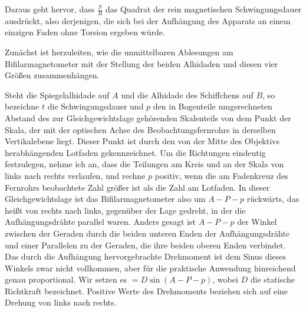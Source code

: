 Daraus geht hervor, dass $\frac{S}{R}$ das Quadrat der rein magnetischen Schwingungsdauer ausdrückt, also derjenigen, die sich bei der Aufhängung des Apparats an einem einzigen Faden ohne Torsion ergeben würde.

Zunächst ist herzuleiten, wie die unmittelbaren Ablesungen am Bifilarmagnetometer mit der Stellung der beiden Alhidaden und diesen vier Größen zusammenhängen.

Steht die Spiegelalhidade auf $A$ und die Alhidade des Schiffchens auf $B$, so bezeichne $t$ die Schwingungsdauer und $p$ den in Bogenteile umgerechneten Abstand des zur Gleichgewichtslage gehörenden Skalenteils von dem Punkt der Skala, der mit der optischen Achse des Beobachtungsfernrohrs in derselben Vertikalebene liegt. Dieser Punkt ist durch den von der Mitte des Objektivs herabhängenden Lotfaden gekennzeichnet. Um die Richtungen eindeutig festzulegen, nehme ich an, dass die Teilungen am Kreis und an der Skala von links nach rechts verlaufen, und rechne $p$ positiv, wenn die am Fadenkreuz des Fernrohrs beobachtete Zahl größer ist als die Zahl am Lotfaden. In dieser Gleichgewichtslage ist das Bifilarmagnetometer also um $A-P-p$ rückwärts, das heißt von rechts nach links, gegenüber der Lage gedreht, in der die Aufhängungsdrähte parallel waren. Anders gesagt ist $A-P-p$ der Winkel zwischen der Geraden durch die beiden unteren Enden der Aufhängungsdrähte und einer Parallelen zu der Geraden, die ihre beiden oberen Enden verbindet. Das durch die Aufhängung hervorgebrachte Drehmoment ist dem Sinus dieses Winkels zwar nicht vollkommen, aber für die praktische Anwendung hinreichend genau proportional. Wir setzen es $=D\sin(A-P-p)$, wobei $D$ die statische Richtkraft bezeichnet. Positive Werte des Drehmoments beziehen sich auf eine Drehung von links nach rechts.

